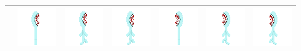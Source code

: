 \documentclass[../Main.tex]{subfiles}
\begin{document}
\begin{center}
\begin{tabular}{ | m{} | m{} m{} m{} m{} m{} m{} | }
                    & \centerline{\includegraphics[scale=3]{../res/textures/entities/enemies/frost/East.png}} & \centerline{\includegraphics[scale=3]{../res/textures/entities/enemies/frost/East-Walk-1.png}} & \centerline{\includegraphics[scale=3]{../res/textures/entities/enemies/frost/East-Walk-2.png}} & \centerline{\includegraphics[scale=3]{../res/textures/entities/enemies/frost/West.png}} & \centerline{\includegraphics[scale=3]{../res/textures/entities/enemies/frost/West-Walk-1.png}} & \centerline{\includegraphics[scale=3]{../res/textures/entities/enemies/frost/West-Walk-2.png}} \\
                    \hline

\end{tabular}
\end{center}
\end{document}
